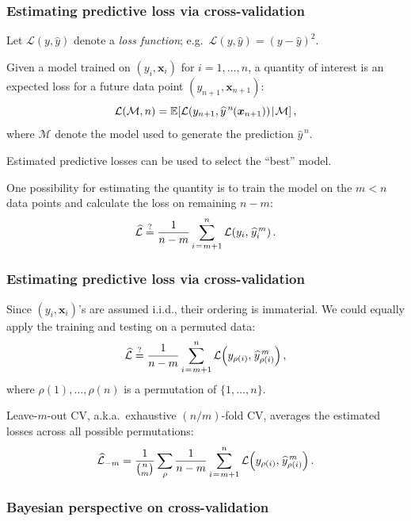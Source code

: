 \documentclass[18pt, handout]{beamer}
\newcommand{\defineTightSpacing}{%
	\setlength{\abovedisplayskip}{.25\baselineskip}%
	\setlength{\belowdisplayskip}{.25\baselineskip}%
}
\renewcommand{\textsc}[1]{{\small \MakeUppercase{#1}}}
\newcommand{\given}{\thinnerspace | \thinnerspace}
\newcommand{\thinnerspace}{\mskip.5\thinmuskip}
\newcommand{\expectation}{\mathbb{E}}
\newcommand{\bx}{\bm{x}}
\newcommand{\loss}{\mathcal{L}}
\newcommand{\modelSymbol}{\mathcal{M}}
\newcommand{\permutation}{\rho}
\newcommand{\trainingSize}{m}
\newcommand{\testSampleIndex}{i}
\newcommand{\testOutcome}{y_{\permutation(\testSampleIndex)}} %
\newcommand{\testOutcomePredicted}{\widehat{y}_{\permutation(\testSampleIndex)}^{\, \trainingSize}}
\begin{document}
\begin{frame}
\frametitle{Estimating predictive loss via cross-validation}
Let $\loss(y, \widehat{y})$ denote a \textit{loss function}; e.g.\ $\loss(y, \widehat{y}) = (y - \widehat{y})^2$.

\smallskip
Given a model trained on $(y_i, \bx_i)$ for $i = 1, \ldots, n$, a quantity of interest is an expected loss for a future data point $(y_{n + 1}, \bx_{n + 1})$:
\begin{equation*} \defineTightSpacing%
\loss(\modelSymbol, n)
= \expectation\!\left[
	\loss(y_{n + 1}, \widehat{y}^{\, n}\mkern-1mu(\bx_{n + 1}))
	\given \modelSymbol
\right],
\end{equation*}
where $\modelSymbol$ denote the model used to generate the prediction $\widehat{y}^{\, n}$.

\smallskip
Estimated predictive losses can be used to select the ``best'' model.

\smallskip
One possibility for estimating the quantity is to train the model on the $\trainingSize < n$ data points and calculate the loss on remaining $n - \trainingSize$:
\begin{equation*} \defineTightSpacing%
\widehat{\loss} \overset{?}{=}
	\frac{1}{n - \trainingSize}\sum_{\testSampleIndex \thinnerspace = \thinnerspace \trainingSize + 1}^n
	\loss\!\left(
		y_i, \thinnerspace \widehat{y}_{\testSampleIndex}^{\, \trainingSize}
	\right).
\end{equation*}
\end{frame}


\begin{frame}
\frametitle{Estimating predictive loss via cross-validation}
Since $(y_i, \bx_i)$'s are assumed i.i.d., their ordering is immaterial. 
We could equally apply the training and testing on a permuted data:
\begin{equation*} \defineTightSpacing%
\widehat{\loss} \overset{?}{=}
	\frac{1}{n - \trainingSize}\sum_{\testSampleIndex \thinnerspace = \thinnerspace \trainingSize + 1}^n
	\loss\!\left(
		\testOutcome, \thinnerspace \testOutcomePredicted
	\right),
\end{equation*}
where $\permutation(1), \ldots, \permutation(n)$ is a permutation of $\{ 1, \ldots, n\}$. 

\smallskip
Leave-$\trainingSize$-out \textsc{CV}, a.k.a.\ exhaustive $(n / \trainingSize)$-fold \textsc{CV}, averages the estimated losses across all possible permutations:
\begin{equation*} \defineTightSpacing%
\widehat{\loss}_{-\trainingSize} =
	\frac{1}{{n \choose \trainingSize}} \sum_{\permutation}
	\frac{1}{n - \trainingSize}\sum_{\testSampleIndex \thinnerspace = \thinnerspace \trainingSize + 1}^n
	\loss\!\left(
		\testOutcome, \thinnerspace \testOutcomePredicted
	\right).
\end{equation*}
\end{frame}


\begin{frame}
\frametitle{Bayesian perspective on cross-validation}

\end{frame}


\end{document}

